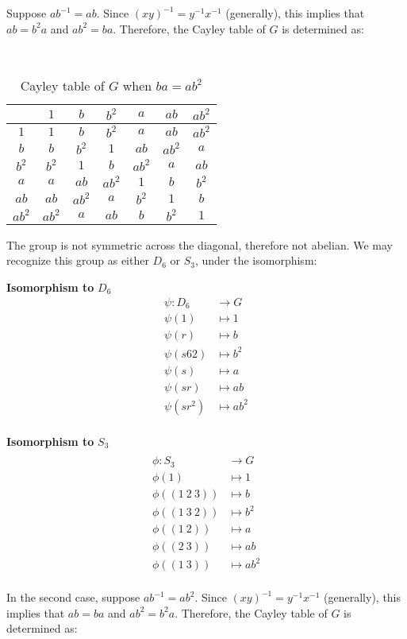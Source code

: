 Suppose ${ab}^{-1} = ab$.
Since ${(xy)}^{-1} = y^{-1}x^{-1}$ (generally), this implies that
$ab = b^2a$ and $ab^2 = ba$.
Therefore, the Cayley table of $G$ is determined as:

\begin{center}
  \begin{table}[H]~\label{tab:cayley-table-order-6=a}
    \begin{tabular}{|c|c|c|c|c|c|c|}
      \hline
      & $1$ & $b$ & $b^2$ & $a$ & $ab$ & $ab^2$ \\
      \midrule
      $1$ & $1$ & $b$ & $b^2$ & $a$ & $ab$ & $ab^2$ \\
      $b$ & $b$ & $b^2$ & $1$ & $ab$ & $ab^2$ & $a$ \\
      $b^2$ & $b^2$ & $1$ & $b$ & $ab^2$ & $a$ & $ab$ \\
      $a$ & $a$ & $ab$ & $ab^2$ & $1$ & $b$ & $b^2$ \\
      $ab$ & $ab$ & $ab^2$ & $a$ & $b^2$ & $1$ & $b$ \\
      $ab^2$ & $ab^2$ & $a$ & $ab$ & $b$ & $b^2$ & $1$ \\
      \bottomrule
    \end{tabular}
    \caption{Cayley table of $G$ when $ba = ab^2$}
  \end{table}
\end{center}

The group is not symmetric across the diagonal, therefore not abelian.
We may recognize this group as either $D_6$ or $S_3$,
under the isomorphism:
\begin{multicols}{2}
  \textbf{Isomorphism to} $D_6$
  \begin{align*}
    \psi \colon D_6 &\to G \\
    \psi(1) &\mapsto 1 \\
    \psi(r) &\mapsto b \\
    \psi(s62) &\mapsto b^2 \\
    \psi(s) &\mapsto a \\
    \psi(sr) &\mapsto ab \\
    \psi(sr^2) &\mapsto ab^2 \\
  \end{align*}
  \columnbreak

  \textbf{Isomorphism to} $S_3$
  \begin{align*} \\
    \phi \colon S_3 &\to G \\
    \phi(1) &\mapsto 1 \\
    \phi((1\ 2\ 3)) &\mapsto b \\
    \phi((1\ 3\ 2)) &\mapsto b^2 \\
    \phi((1\ 2)) &\mapsto a \\
    \phi((2\ 3)) &\mapsto ab \\
    \phi((1\ 3)) &\mapsto ab^2 \\
  \end{align*}
\end{multicols}
In the second case, suppose ${ab}^{-1} = ab^2$.
Since ${(xy)}^{-1} = y^{-1}x^{-1}$ (generally), this implies that
$ab = ba$ and $ab^2 = b^2a$.
Therefore, the Cayley table of $G$ is determined as:

